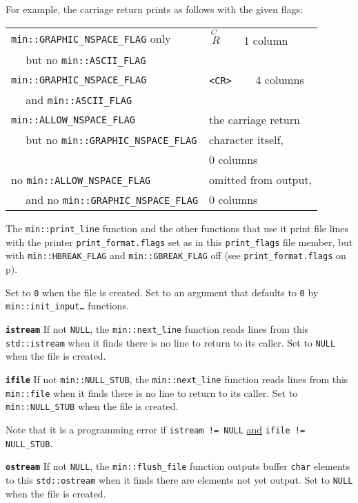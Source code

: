 \documentclass[12pt]{article}
\makeatletter
\newcommand{\TT}[1]{{\tt \bfseries #1}}
\newcommand{\ttmkey}[2]{\TT{#1}\index{#1@{\tt #1}!#2}}
\newcommand{\pagref}[1]{p\pageref{#1}}
\newcommand{\EOL}{\penalty \exhyphenpenalty}
\newenvironment{itemlist}[1][1.2in]%
	{\begin{list}{}{\setlength{\labelwidth}{#1}%
		        \setlength{\leftmargin}{\labelwidth}%
		        \addtolength{\leftmargin}{+0.2in}%
		        \renewcommand{\makelabel}[1]{##1\hfill}}}%
	{\end{list}}
\makeatother
\begin{document}
\begin{itemlist}[1.4in]
For example, the carriage
return prints as follows with the given flags:
\begin{center}
\begin{tabular}{l@{~~~~}l}
{\tt min::GRAPHIC\_NSPACE\_FLAG} only
	& {\tiny $\stackrel{\textstyle C~}{~R}$} ~~~ 1 column \\
~~ but no {\tt min::ASCII\_FLAG}
\\[1ex]
{\tt min::GRAPHIC\_NSPACE\_FLAG} & {\tt <CR>} ~~~ 4 columns \\
~~ and {\tt min::ASCII\_FLAG}
\\[1ex]
{\tt min::ALLOW\_NSPACE\_FLAG}   & the carriage return \\
~~ but no {\tt min::GRAPHIC\_NSPACE\_FLAG} & character itself, \\
					   & 0 columns
\\[1ex]
no {\tt min::ALLOW\_NSPACE\_FLAG}   & omitted from output, \\
~~ and no {\tt min::GRAPHIC\_NSPACE\_FLAG}  & 0 columns
\end{tabular}
\end{center}

The {\tt min::print\_line} function and the other functions that use
it print file lines with the printer {\tt print\_\EOL format.flags}
set as in this {\tt print\_\EOL flags} file member, but with
{\tt min::\EOL HBREAK\_\EOL FLAG} and {\tt min::\EOL GBREAK\_\EOL FLAG}
off (see {\tt print\_\EOL format.flags} on \pagref{PRINT_FORMAT_FLAGS}).

Set to {\tt 0} when the file is created.  Set to an argument
that defaults to {\tt 0}
by {\tt min::\EOL init\_\EOL input\ldots} functions.

\item[\ttmkey{istream}{in {\tt min::file}}]
If not {\tt NULL}, the {\tt min::\EOL next\_\EOL line} function
reads lines from this {\tt std::\EOL istream} when it finds
there is no line to return to its caller.
Set to {\tt NULL} when the file is created.

\item[\ttmkey{ifile}{in {\tt min::file}}]
If not {\tt min::NULL\_STUB}, the {\tt min::\EOL next\_\EOL line} function
reads lines from this {\tt min::\EOL file} when it finds
there is no line to return to its caller.
Set to {\tt min::\EOL NULL\_\EOL STUB} when the file is created.

Note that it is a programming error if {\tt istream != NULL}
\underline{and} {\tt ifile != NULL\_\EOL STUB}.

\item[\ttmkey{ostream}{in {\tt min::file}}]
If not {\tt NULL}, the {\tt min::\EOL flush\_\EOL file} function
outputs buffer {\tt char} elements to this {\tt std::\EOL ostream} when it finds
there are elements not yet output.
Set to {\tt NULL} when the file is created.


\end{itemlist}
\end{document}

